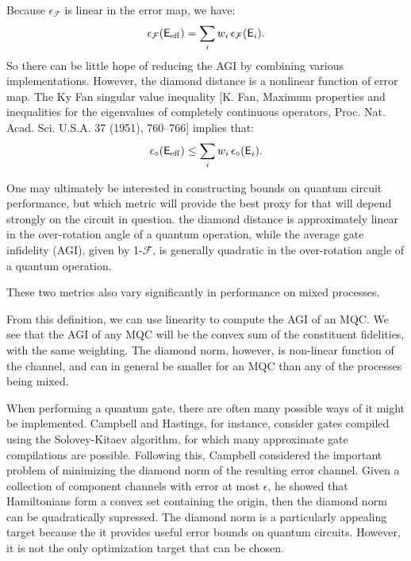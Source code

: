 \documentclass[aps,nofootinbib,pra,notitlepage,twocolumn]{revtex4-1}
\newcommand{\actual}{\ensuremath{\tilde{\mathsf{G}}}}
\newcommand{\error}{\ensuremath{{\mathsf{E}}}}
\begin{document}
Because $\epsilon_{\mathcal{F}}$ is linear in the error map, we have:
\begin{equation}
	\epsilon_{\mathcal{F}}\!\left(\mathsf{E}_{\rm eff}\right) = \sum_i w_i \,\epsilon_{\mathcal{F}}(\mathsf{E}_i).
\end{equation}
So there can be little hope of reducing the AGI by combining various implementations. However, the diamond distance is a nonlinear function of error map. The Ky Fan singular value inequality [K. Fan, Maximum properties and inequalities for the eigenvalues of completely continuous operators, Proc. Nat. Acad. Sci. U.S.A. 37 (1951), 760–766] implies that:
\begin{equation}
	\epsilon_\diamond\!\left(\mathsf{E}_{\rm eff}\right) \le \sum_i w_i \, \epsilon_\diamond(\mathsf{E}_i).
\end{equation}


One may ultimately be interested in constructing bounds on quantum circuit performance, but which metric will provide the best proxy for that will depend strongly on the circuit in question. the diamond distance is approximately linear in the over-rotation angle of a quantum operation, while the average gate infidelity (AGI), given by 1-$\mathcal{F}$, is generally quadratic in the over-rotation angle of a quantum operation. 

These two metrics also vary significantly in performance on mixed processes.  

From this definition, we can use linearity to compute the AGI of an MQC. We see that the AGI of any MQC will be the convex sum of the constituent fidelities, with the same weighting. The diamond norm, however, is non-linear function of the channel, and can in general be smaller for an MQC than any of the processes being mixed. 


When performing a quantum gate, there are often many possible ways of it might be implemented. Campbell and Hastings, for instance, consider gates compiled using the Solovey-Kitaev algorithm, for which many approximate gate compilations are possible.\cite{Campbell2017, 1612.01011} Following this, Campbell considered the important problem of minimizing the diamond norm of the resulting error channel. Given a collection of component channels with error at most $\epsilon$, he showed that Hamiltonians form a convex set containing the origin, then the diamond norm can be quadratically supressed. The diamond norm is a particularly appealing target because the it provides useful error bounds on quantum circuits. However, it is not the only optimization target that can be chosen. 
\end{document}
